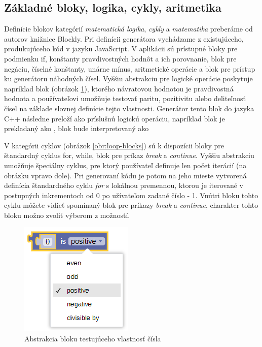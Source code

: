 \subsection{Základné bloky, logika, cykly, aritmetika}
Definície blokov kategórií \textit{matematická logika}, \textit{cykly} a \textit{matematika} preberáme od autorov knižnice Blockly. Pri definícii generátora vychádzame z existujúceho, produkujúceho kód v jazyku JavaScript. V aplikácii sú prístupné bloky pre podmienku if, konštanty pravdivostných hodnôt a ich porovnanie, blok pre negáciu, číselné konštanty, unárne mínus, aritmetické operácie a blok pre prístup ku generátoru náhodných čísel. Vyššiu abstrakciu pre logické operácie poskytuje napríklad blok  (obrázok \ref{obr:block-number-property}), ktorého návratovou hodnotou je pravdivostná hodnota a používateľovi umožňuje testovať paritu, pozitivitu alebo deliteľnosť čísel na základe slovnej definície tejto vlastnosti. Generátor tento blok do jazyka C++ následne preloží ako príslušnú logickú operáciu, napríklad blok  je prekladaný ako , blok  bude interpretovaný ako  

V kategórii cyklov (obrázok \ref{obr:loop-blocks}) sú k dispozícii bloky pre štandardný cyklus for, while, blok pre príkaz \textit{break} a \textit{continue}. Vyššiu abstrakciu umožňuje špeciálny cyklus, pre ktorý používateľ definuje len počet iterácií (na obrázku vpravo dole). Pri generovaní kódu je potom na jeho mieste vytvorená definícia štandardného cyklu \textit{for} s lokálnou premennou, ktorou je iterované v postupných inkrementoch od 0 po užívateľom zadané číslo - 1. Vnútri bloku tohto cyklu môžete vidieť spomínaný blok pre príkazy \textit{break} a \textit{continue}, charakter tohto bloku možno zvoliť výberom z možností.

\begin{figure}
\centerline{\includegraphics[]{images/block-number-property}}
\caption[Abstrakcia bloku testujúceho vlastnosť čísla]{Abstrakcia bloku testujúceho vlastnosť čísla}
\label{obr:block-number-property}
\end{figure}

